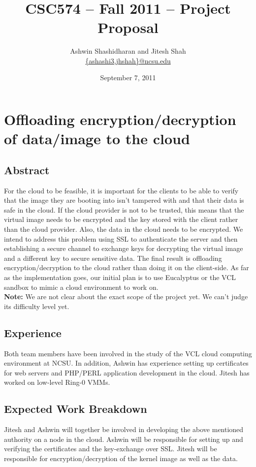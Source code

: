 \documentclass[11pt,pdftex]{article}
\title{CSC574 -- Fall 2011 -- Project Proposal}
\author{Ashwin Shashidharan and Jitesh Shah \\
\url{{ashashi3,jhshah}@ncsu.edu}
}
\date{September 7, 2011}
\begin{document}
\maketitle

\section{Offloading encryption/decryption of data/image to the cloud}

\subsection{Abstract}

For the cloud to be feasible, it is important for the clients to be able to verify that the image they are booting into isn't tampered with and that their data is safe in the cloud. If the cloud provider is not to be trusted, this means that the virtual image needs to be encrypted and the key stored with the client rather than the cloud provider. Also, the data in the cloud needs to be encrypted. We intend to address this problem using SSL to authenticate the server and then establishing a secure channel to exchange keys for decrypting the virtual image and a different key to secure sensitive data. The final result is offloading encryption/decryption to the cloud rather than doing it on the client-side. As far as the implementation goes, our initial plan is to use Eucalyptus or the VCL sandbox to mimic a cloud environment to work on.\\
\textbf{Note:} We are not clear about the exact scope of the project yet. We can't judge its difficulty level yet.

\subsection{Experience}

Both team members have been involved in the study of the VCL cloud computing environment at NCSU. In addition, Ashwin has experience setting up certificates for web servers and PHP/PERL application development in the cloud. Jitesh has worked on low-level Ring-0 VMMs. 

\subsection{Expected Work Breakdown}

Jitesh and Ashwin will together be involved in developing the above mentioned authority on a node in the cloud. Ashwin will be responsible for setting up and verifying the certificates and the key-exchange over SSL. Jitesh will be responsible for encryption/decryption of the kernel image as well as the data.
\end{document}
